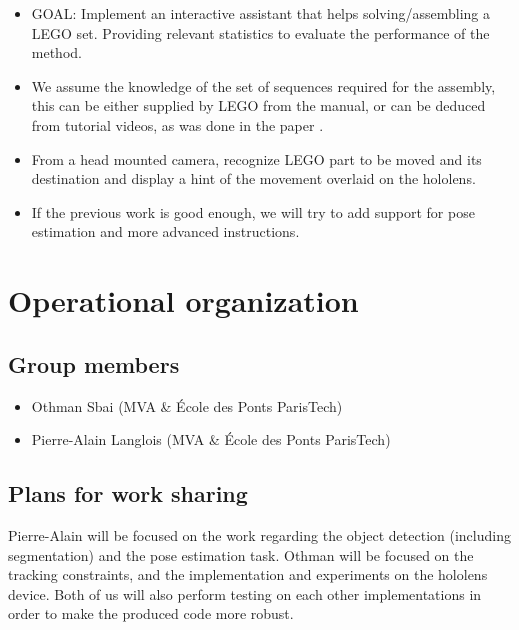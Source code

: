 \documentclass[a4paper,10pt]{article}
\begin{document}
\begin{itemize}
 \item GOAL: Implement an interactive assistant that helps solving/assembling a LEGO set. Providing relevant statistics to evaluate the performance of the method.
 \item We assume the knowledge of the set of sequences required for the assembly, this can be either 
 supplied by LEGO from the manual, or can be deduced from tutorial videos, as was done in the paper 
 \cite{alayrac_unsupervised_2015}.
 \item From a head mounted camera, recognize LEGO part to be moved and its destination and display a 
 hint of the movement overlaid on the hololens.
 \item If the previous work is good enough, we will try to add support for pose estimation and more 
 advanced instructions.

\end{itemize}


\section{Operational organization}

\subsection{Group members}

\begin{itemize}
 \item Othman Sbai (MVA \& École des Ponts ParisTech)
 \item Pierre-Alain Langlois (MVA \& École des Ponts ParisTech)
\end{itemize}


\subsection{Plans for work sharing}

Pierre-Alain will be focused on the work regarding the object detection (including segmentation) and the 
pose estimation task.
Othman will be focused on the tracking constraints, and the implementation and experiments on the hololens 
device. Both of us will also perform testing on each other implementations in order to make the produced 
code more robust.




\end{document}
